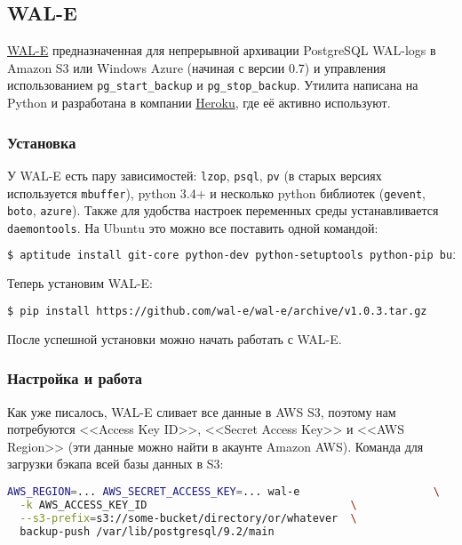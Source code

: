 \subsection{WAL-E}

\href{https://github.com/wal-e/wal-e}{WAL-E} предназначенная для непрерывной архивации PostgreSQL WAL-logs в Amazon S3 или Windows Azure (начиная с версии 0.7) и управления использованием \lstinline!pg_start_backup! и \lstinline!pg_stop_backup!. Утилита написана на Python и разработана в компании \href{http://www.heroku.com/}{Heroku}, где её активно используют.


\subsubsection{Установка}

У WAL-E есть пару зависимостей: \lstinline!lzop!, \lstinline!psql!, \lstinline!pv! (в старых версиях используется \lstinline!mbuffer!), python 3.4+ и несколько python библиотек (\lstinline!gevent!, \lstinline!boto!, \lstinline!azure!). Также для удобства настроек переменных среды устанавливается \lstinline!daemontools!. На Ubuntu это можно все поставить одной командой:

\begin{lstlisting}[language=Bash,label=lst:wal-e1,caption=Установка зависимостей для WAL-E]
$ aptitude install git-core python-dev python-setuptools python-pip build-essential libevent-dev lzop pv daemontools daemontools-run
\end{lstlisting}

Теперь установим WAL-E:

\begin{lstlisting}[language=Bash,label=lst:wal-e2,caption=Установка WAL-E]
$ pip install https://github.com/wal-e/wal-e/archive/v1.0.3.tar.gz
\end{lstlisting}

После успешной установки можно начать работать с WAL-E.

\subsubsection{Настройка и работа}

Как уже писалось, WAL-E сливает все данные в AWS S3, поэтому нам потребуются <<Access Key ID>>, <<Secret Access Key>> и <<AWS Region>> (эти данные можно найти в акаунте Amazon AWS). Команда для загрузки бэкапа всей базы данных в S3:

\begin{lstlisting}[language=Bash,label=lst:wal-e3,caption=Загрузка бэкапа всей базы данных в S3]
AWS_REGION=... AWS_SECRET_ACCESS_KEY=... wal-e                     \
  -k AWS_ACCESS_KEY_ID                                \
  --s3-prefix=s3://some-bucket/directory/or/whatever  \
  backup-push /var/lib/postgresql/9.2/main
\end{lstlisting}

